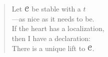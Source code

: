 

\section*{}

\vspace*{6cm}


\begin{verse}
    \hspace{3em}Let $\EuScript{C}$ be stable with a $t$ \\
    \vspace{5pt}
    \hspace{3em}---as nice as it needs to be. \\
    \vspace{5pt}
    \hspace{3em}If the heart has a localization, \\
    \vspace{5pt}
    \hspace{3em}then I have a declaration: \\
    \vspace{5pt}
    \hspace{3em}There is a unique lift to $\EuScript{C}$. 

\end{verse}